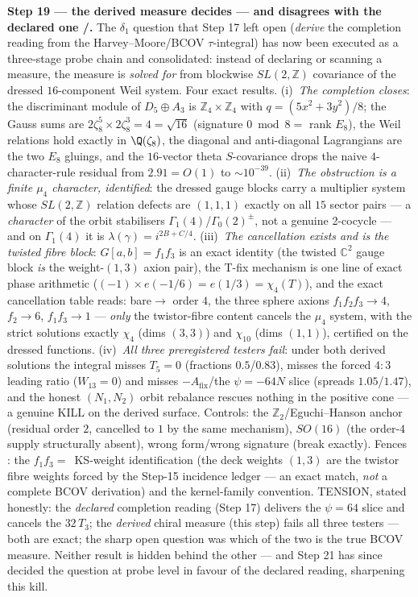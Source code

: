 \documentclass[11pt,a4paper]{article}
\newcommand{\Z}{\mathbb{Z}}
\theoremstyle{definition}
\begin{document}
\par\smallskip\noindent\textbf{Step 19 --- the derived measure decides --- and disagrees with the
declared one \mE/\mC.} The $\delta_1$ question that Step 17 left open (\emph{derive} the
completion reading from the Harvey--Moore/BCOV $\tau$-integral) has now been executed as a
three-stage probe chain and consolidated: instead of declaring or scanning a measure, the
measure is \emph{solved for} from blockwise $SL(2,\Z)$ covariance of the dressed
$16$-component Weil system. Four exact results. (i)~\emph{The completion closes}: the
discriminant module of $D_5{\oplus}A_3$ is $\Z_4{\times}\Z_4$ with $q=(5x^2{+}3y^2)/8$; the
Gauss sums are $2\zeta_8^5\times2\zeta_8^3=4=\sqrt{16}$ (signature $0\bmod8=$ rank $E_8$), the
Weil relations hold exactly in $\Q(\zeta_8)$, the diagonal and anti-diagonal Lagrangians are
the two $E_8$ gluings, and the $16$-vector theta $S$-covariance drops the naive
$4$-character-rule residual from $2.91=O(1)$ to $\sim10^{-39}$. (ii)~\emph{The obstruction is
a finite $\mu_4$ character, identified}: the dressed gauge blocks carry a multiplier system
whose $SL(2,\Z)$ relation defects are $(1,1,1)$ exactly on all $15$ sector pairs --- a
\emph{character} of the orbit stabilisers $\Gamma_1(4)$/$\Gamma_0(2)^\pm$, not a genuine
2-cocycle --- and on $\Gamma_1(4)$ it is $\lambda(\gamma)=i^{2B+C/4}$. (iii)~\emph{The
cancellation exists and is the twisted fibre block}: $G[a,b]=f_1f_3$ is an exact identity (the
twisted $\mathbb C^2$ gauge block \emph{is} the weight-$(1,3)$ axion pair), the T-fix
mechanism is one line of exact phase arithmetic ($(-1)\times e(-1/6)=e(1/3)=\chi_4(T)$), and
the exact cancellation table reads: bare${}\to$ order $4$, the three sphere axions
$f_1f_2f_3\to4$, $f_2\to6$, $f_1f_3\to1$ --- \emph{only} the twistor-fibre content cancels the
$\mu_4$ system, with the strict solutions exactly $\chi_4$ (dims $(3,3)$) and $\chi_{10}$
(dims $(1,1)$), certified on the dressed functions. (iv)~\emph{All three preregistered testers
fail}: under both derived solutions the integral misses $T_5=0$ (fractions $0.5$/$0.83$),
misses the forced $4{:}3$ leading ratio ($W_{13}=0$) and misses $-A_{\mathrm{fix}}$/the
$\psi=-64N$ slice (spreads $1.05$/$1.47$), and the honest $(N_1,N_2)$ orbit rebalance rescues
nothing in the positive cone --- a genuine KILL on the derived surface. Controls: the
$\Z_2$/Eguchi--Hanson anchor (residual order $2$, cancelled to $1$ by the same mechanism),
$SO(16)$ (the order-$4$ supply structurally absent), wrong form/wrong signature (break
exactly). Fences \mC: the $f_1f_3=$~KS-weight identification (the deck weights $(1,3)$ are the
twistor fibre weights forced by the Step-15 incidence ledger --- an exact match, \emph{not} a
complete BCOV derivation) and the kernel-family convention. TENSION, stated honestly: the
\emph{declared} completion reading (Step 17) delivers the $\psi=64$ slice and cancels the
$32\,T_3$; the \emph{derived} chiral measure (this step) fails all three testers --- both are
exact; the sharp open question was which of the two is the true BCOV measure. Neither result is
hidden behind the other --- and Step 21 has since decided the question at probe level in favour
of the declared reading, sharpening this kill.
\end{document}
